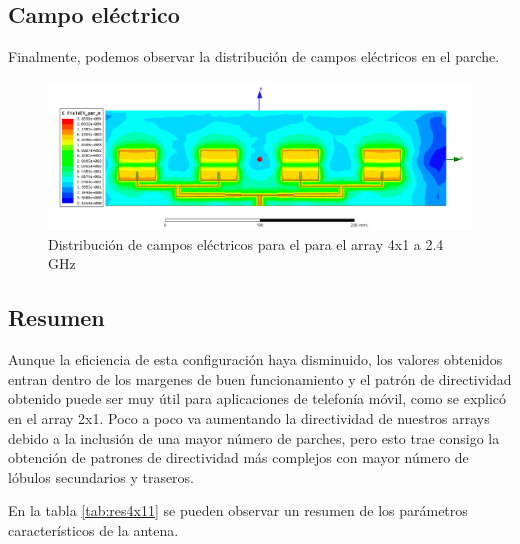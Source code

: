\subsection{Campo eléctrico}
\par Finalmente, podemos observar la distribución de campos eléctricos en el parche. 

\begin{figure}[H]
    \centering
        \includegraphics[width=\textwidth]{archivos/analisis/4x11/8}
        \caption{Distribución de campos eléctricos para el para el array 4x1 a 2.4 GHz}
        \label{fig:elec4x11}
\end{figure}

\subsection{Resumen}
\par Aunque la eficiencia de esta configuración haya disminuido, los valores obtenidos entran dentro de los margenes de buen funcionamiento y el patrón de directividad obtenido puede ser muy útil para aplicaciones de telefonía móvil, como se explicó en el array 2x1. Poco a poco va aumentando la directividad de nuestros arrays debido a la inclusión de una mayor número de parches, pero esto trae consigo la obtención de patrones de directividad más complejos con mayor número de lóbulos secundarios y traseros. 
\\
\par En la tabla \ref{tab:res4x11} se pueden observar un resumen de los parámetros característicos de la antena.

